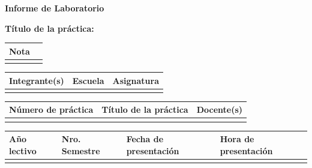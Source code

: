 


	\vspace*{10px}

	\begin{center}
		\fontsize{17}{17} \textbf{ Informe de Laboratorio \itemPracticeNumber}
	\end{center}
	\begin{center}
		\textbf{\Large Título de la práctica: \itemTheme}
	\end{center}

	\begin{flushright}
		\begin{tabular}{|M{2.5cm}|N|}
			\hline
			\color{white} \textbf{Nota}  \\
			\hline
			     \\[30pt]
			\hline
		\end{tabular}
	\end{flushright}

	\begin{table}[H]
		\centering
		\begin{tabular}{|x{4.7cm}|x{4.8cm}|x{4.8cm}|}
			\hline
			\color{white} \textbf{Integrante(s)} & \color{white}\textbf{Escuela}  & \color{white}\textbf{Asignatura}   \\
			\hline
			{\itemIntegrante \par \itemEmail} & \itemSchool & \itemAsignatura     \\
			\hline
		\end{tabular}
	\end{table}

	\begin{table}[H]
		\centering
		\begin{tabular}{|x{4.7cm}|x{4.8cm}|x{4.8cm}|}
			\hline
			\color{white}\textbf{Número de práctica} & \color{white}\textbf{Título de la práctica}  & \color{white}\textbf{Docente(s)}   \\
			\hline
			\itemPracticeNumber & \itemTheme & \itemDocente   \\
			\hline
		\end{tabular}
	\end{table}

	\begin{table}[H]
		\centering
		\begin{tabular}{|x{3.5cm}|x{3.5cm}|x{3.5cm}|x{3.5cm}|}
			\hline
			\color{white}\textbf{Año lectivo} & \color{white}\textbf{Nro. Semestre}  & \color{white}\textbf{Fecha de presentación} & \color{white}\textbf{Hora de presentación}   \\
			\hline
			\itemAnioLectivo & \itemNroSemestre & \itemFechaPresentacion & \itemHoraPresentacion  \\
			\hline
		\end{tabular}
	\end{table}

	\newpage
	\tableofcontents
	\newpage
	\listoffigures
	\newpage
	\listoftables
	\newpage
